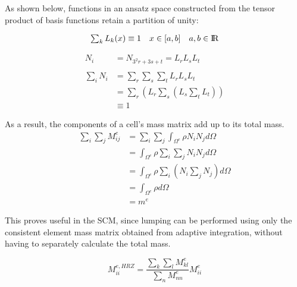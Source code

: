 As shown below, functions in an ansatz space constructed from the tensor product of basis functions
retain a partition of unity:

\begin{equation*}
\begin{array}{rll}
	\sum_k L_k(x) \equiv 1 & x \in [a,b] & a,b \in \rm I\!R \\
\end{array}
\end{equation*}

\begin{equation}
\begin{array}{rl}
	N_i &= N_{3^2r + 3s + t} = L_r L_s L_t \\
	\\
	\sum_i N_i
	&= \sum_r \sum_s \sum_t L_r L_s L_t	\\
	&= \sum_r
	\left(
		L_r \sum_s
		\left(
			L_s \sum_t L_t
		\right)
	\right) \\
	& \equiv 1
\end{array}
\end{equation}


As a result, the components of a cell's mass matrix add up to its total mass.
\begin{equation}
\begin{aligned}
	\sum_i \sum_j M_{ij}^e &= \sum_i \sum_j \int_{\Omega^e} \rho N_i N_j d\Omega \\
	&= \int_{\Omega^e} \rho \sum_i \sum_j N_i N_j d\Omega \\
	&= \int_{\Omega^e} \rho \sum_i
	\left(
		N_i \sum_j N_j
	\right)
	d\Omega \\
	&= \int_{\Omega^e} \rho d\Omega \\
	&= m^e
\end{aligned}
\end{equation}

This proves useful in the SCM, since lumping can be performed using only the consistent
element mass matrix obtained from adaptive integration, without having to separately
calculate the total mass.

\begin{equation}
	M_{ii}^{e,HRZ} =
	\frac{\sum_k \sum_l M_{kl}^e}{\sum_n M_{nn}^e} M_{ii}^e
\end{equation}